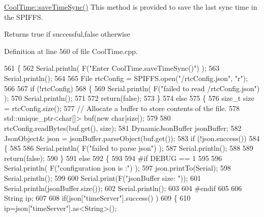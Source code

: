 \hyperlink{class_cool_time_ae9658c9b377510d469e3b88edf33ee85}{Cool\+Time\+::save\+Time\+Sync()} This method is provided to save the last sync time in the S\+P\+I\+F\+FS.

\begin{DoxyReturn}{Returns}
true if successful,false otherwise 
\end{DoxyReturn}


Definition at line 560 of file Cool\+Time.\+cpp.


\begin{DoxyCode}
561 \{
562     Serial.println( F(\textcolor{stringliteral}{"Enter CoolTime.saveTimeSync()"}) );
563     Serial.println();
564 
565     File rtcConfig = SPIFFS.open(\textcolor{stringliteral}{"/rtcConfig.json"}, \textcolor{stringliteral}{"r"});
566 
567     \textcolor{keywordflow}{if} (!rtcConfig) 
568     \{
569         Serial.println( F(\textcolor{stringliteral}{"failed to read /rtcConfig.json"}) );
570         Serial.println();
571 
572         \textcolor{keywordflow}{return}(\textcolor{keyword}{false});
573     \}
574     \textcolor{keywordflow}{else}
575     \{
576         \textcolor{keywordtype}{size\_t} size = rtcConfig.size();
577         \textcolor{comment}{// Allocate a buffer to store contents of the file.}
578         std::unique\_ptr<char[]> buf(\textcolor{keyword}{new} \textcolor{keywordtype}{char}[size]);
579 
580         rtcConfig.readBytes(buf.get(), size);
581         DynamicJsonBuffer jsonBuffer;
582         JsonObject& json = jsonBuffer.parseObject(buf.get());
583         \textcolor{keywordflow}{if} (!json.success()) 
584         \{
585 
586             Serial.println( F(\textcolor{stringliteral}{"failed to parse json"}) );
587             Serial.println();
588 
589             \textcolor{keywordflow}{return}(\textcolor{keyword}{false});
590         \} 
591         \textcolor{keywordflow}{else}
592         \{
593 
594 \textcolor{preprocessor}{        #if DEBUG == 1}
595     
596             Serial.println( F(\textcolor{stringliteral}{"configuration json is :"}) );
597             json.printTo(Serial);
598             Serial.println();
599 
600             Serial.print(F(\textcolor{stringliteral}{"jsonBuffer size: "}));
601             Serial.println(jsonBuffer.size());
602             Serial.println();
603 
604 \textcolor{preprocessor}{        #endif}
605 
606             String ip;
607                     
608             \textcolor{keywordflow}{if}(json[\textcolor{stringliteral}{"timeServer"}].success() )
609             \{           
610                  ip=json[\textcolor{stringliteral}{"timeServer"}].as<String>();

\end{DoxyCode}
